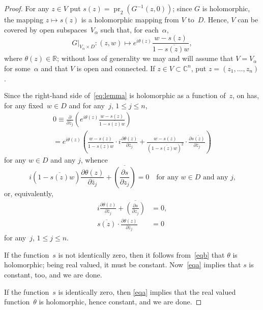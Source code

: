 \documentclass[10pt,a4paper]{amsart}
\newcommand*{\C}{{\mathbb C}}
\newcommand*{\R}{{\mathbb R}}
\DeclareMathOperator{\pr}{pr}
\begin{document}
\begin{proof}
For any $z\in V$ put $s(z)=\pr_2(G^{-1}(z,0))$; since $G$ is holomorphic,
the mapping $z\mapsto s(z)$ is a holomorphic mapping from $V$
to~$D$. Hence, $V$ can be covered by open subspaces~$V_\alpha$ such
that, for each~$\alpha$,
\begin{equation}\label{eq:lemma}
  G|_{V_\alpha\times D}\colon (z,w)\mapsto e^{i\theta(z)}
  \frac{w-s(z)}{1-\overline{s(z)}w},  
\end{equation}
where $\theta(z)\in\R$; without loss of generality we may and will
assume that $V=V_\alpha$
for some~$\alpha$ and that
$V$ is open and connected. If $z\in V\subset\C^n$, put $z=(z_1,\dots,z_n)$.

Since the right-hand side of~\eqref{eq:lemma} is holomorphic as a
function of~$z$, on has, for any fixed~$w\in D$ and for any~$j$, $1\le
j\le n$,
\begin{multline*}
  0\equiv\frac\partial{\partial \bar z_j}
  \left(e^{i\theta(z)}\frac{w-s(z)}{1-\overline{s(z)}w}\right)\\
{}=e^{i\theta(z)}\left(
\frac{w-s(z)}{1-\overline{s(z)}w}\cdot
i\frac{\partial\theta(z)}{\partial \bar z_j}+
\frac{w-s(z)}{(1-\overline{ s(z)}w)^2}\cdot
\frac{\partial\overline{s(z)}}{\partial \bar z_j}\right)
\end{multline*}
for any $w\in D$ and any $j$, whence
\begin{equation*}
  i(1-\overline{s(z)}w)\frac{\partial\theta(z)}{\partial \bar z_j}
  + \overline{\left(\frac{\partial s}{\partial z_j}\right)}
  =0\quad\text{for
any $w\in D$ and any $j$,}  
\end{equation*}
or, equivalently,
\begin{align}
  i\frac{\partial\theta(z)}{\partial \bar
    z_j}+\overline{\left(\frac{\partial s}{\partial z_j}\right)}
  &=0,\label{eqa}\\ 
\overline{s(z)}\cdot \frac{\partial\theta(z)}{\partial \bar
    z_j}&=0\label{eqb}  
\end{align}
for any~$j$, $1\le j\le n$.

If the function~$s$ is not identically zero, then it follows
from~\eqref{eqb} that $\theta$ is holomorphic; being real valued, it
must be constant. Now~\eqref{eqa} implies that $s$ is constant, too,
and we are done.

If the function~$s$ is identically zero, then \eqref{eqa} implies that
the real valued function~$\theta$ is holomorphic, hence 
constant, and we are done.
\end{proof}
\end{document}
